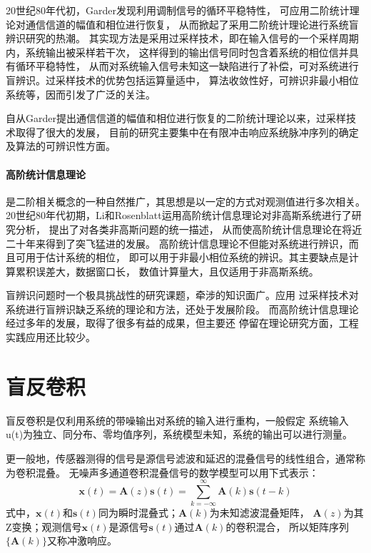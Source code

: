 20世纪80年代初，Garder发现利用调制信号的循环平稳特性，
可应用二阶统计理论对通信信道的幅值和相位进行恢复，
从而掀起了采用二阶统计理论进行系统盲辨识研究的热潮。
其实现方法是采用过采样技术，即在输入信号的一个采样周期内，系统输出被采样若干次，
这样得到的输出信号同时包含着系统的相位信并具有循环平稳特性，
从而对系统输入信号未知这一缺陷进行了补偿，可对系统进行盲辨识。过采样技术的优势包括运算量适中，
算法收敛性好，可辨识非最小相位系统等，因而引发了广泛的关注。

自从Garder提出通信信道的幅值和相位进行恢复的二阶统计理论以来，过采样技术取得了很大的发展，
目前的研究主要集中在有限冲击响应系统脉冲序列的确定及算法的可辨识性方面。

\paragraph*{高阶统计信息理论}
是二阶相关概念的一种自然推广，其思想是以一定的方式对观测值进行多次相关。
20世纪80年代初期，Li和Rosenblatt运用高阶统计信息理论对非高斯系统进行了研究分析，
提出了对各类非高斯问题的统一描述，
从而使高阶统计信息理论在将近二十年来得到了突飞猛进的发展。
高阶统计信息理论不但能对系统进行辨识，而且可用于估计系统的相位，
即可以用于非最小相位系统的辨识。其主要缺点是计算累积误差大，数据窗口长，
数值计算量大，且仅适用于非高斯系统。

盲辨识问题时一个极具挑战性的研究课题，牵涉的知识面广。应用
过采样技术对系统进行盲辨识缺乏系统的理论和方法，还处于发展阶段。
而高阶统计信息理论经过多年的发展，取得了很多有益的成果，但主要还
停留在理论研究方面，工程实践应用还比较少。

\section{盲反卷积}
盲反卷积是仅利用系统的带噪输出对系统的输入进行重构，一般假定
系统输入u(t)为独立、同分布、零均值序列，系统模型未知，系统的输出可以进行测量。

更一般地，传感器测得的信号是源信号滤波和延迟的混叠信号的线性组合，通常称为卷积混叠。
无噪声多通道卷积混叠信号的数学模型可以用下式表示：
\begin{equation} 
\bm{x}(t)=\bm{A}(z)\bm{s}(t) = 
\sum^\infty_{k=-\infty}\bm{A}(k)\bm{s}(t-k)
\end{equation}
式中，$\bm{x}(t)$和$\bm{s}(t)$同为瞬时混叠式；$\bm{A}(k)$为未知滤波混叠矩阵，
$\bm{A}(z)$为其Z变换；观测信号$\bm{x}(t)$是源信号$\bm{s}(t)$通过$\bm{A}(k)$的卷积混合，
所以矩阵序列$\{\bm{A}(k)\}$又称冲激响应。

